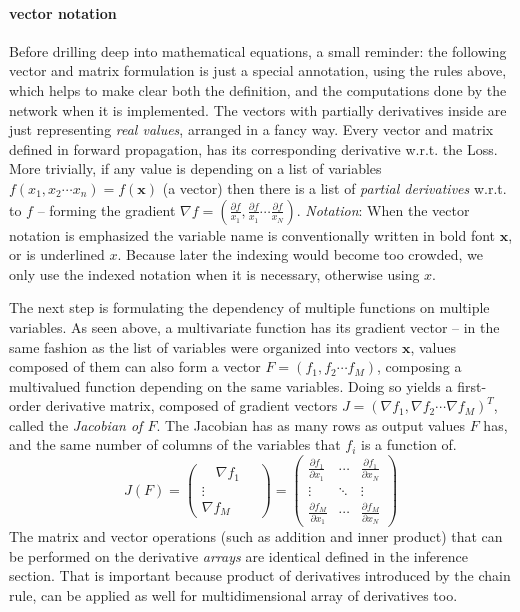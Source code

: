 \paragraph{vector notation}
Before drilling deep into mathematical equations, a small reminder: the following vector and matrix formulation is just a special annotation, 
using the rules above, which helps to make clear both the definition, and the computations done by the network when it is implemented. 
The vectors with partially derivatives inside are just representing \emph{real values}, arranged in a fancy way.
Every vector and matrix defined in forward propagation, has its corresponding derivative w.r.t. the Loss.
More trivially, if any value is depending on a list of variables $f(x_1, x_2 \cdots x_n) = f(\mathbf{x})$ (a vector) then there is a list of \emph{partial derivatives} w.r.t. to $f$ -- forming the gradient $\nabla f = \left(\frac{\partial f}{x_1}, \frac{\partial f}{x_1} \cdots \frac{\partial f}{x_N}\right)$. 
\emph{Notation}: When the vector notation is emphasized the variable name is conventionally written in bold font $\mathbf{x}$, or is underlined \underline{$x$}.
Because later the indexing would become too crowded, we only use the indexed notation when it is necessary, otherwise using $x$.

The next step is formulating the dependency of multiple functions on multiple variables.
As seen above, a multivariate function has its gradient vector --
in the same fashion as the list of variables were organized into vectors $\mathbf{x}$, values composed of them can also form a vector $F = (f_1, f_2 \cdots f_M)$, composing a multivalued function depending on the same variables.
Doing so yields a first-order derivative matrix, composed of gradient vectors $J=(\nabla f_1, \nabla f_2 \cdots \nabla f_M)^T$, called the \emph{Jacobian of $F$}.
The Jacobian has as many rows as output values $F$ has, and the same number of columns of the variables that $f_i$ is a function of.
\begin{equation}\label{eq:jacobian}
    J(F) = 
    \begin{pmatrix}
    \quad \nabla f_1 \quad \\ 
    \vdots \\ 
    \nabla f_M
    \end{pmatrix} 
    =
    \begin{pmatrix}
    \frac{\partial f_1}{\partial x_1} & \cdots & \frac{\partial f_1}{\partial x_N} \\ 
    \vdots & \ddots & \vdots \\ 
    \frac{\partial f_M}{\partial x_1} & \cdots & \frac{\partial f_M}{\partial x_N}
    \end{pmatrix} 
\end{equation}
The matrix and vector operations (such as addition and inner product) that can be performed on the derivative \emph{arrays} are identical defined in the inference section. That is important because product of derivatives introduced by the chain rule, can be applied as well for multidimensional array of derivatives too.


